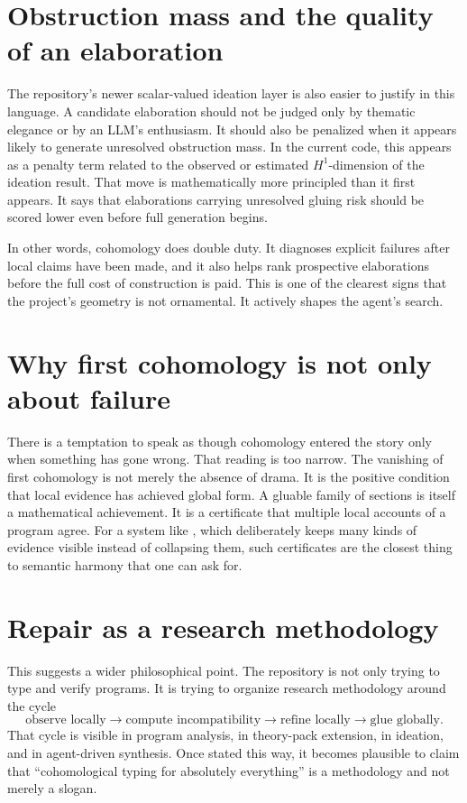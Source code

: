 \section*{Obstruction mass and the quality of an elaboration}
The repository's newer scalar-valued ideation layer is also easier to justify in this
language. A candidate elaboration should not be judged only by thematic elegance or by an
LLM's enthusiasm. It should also be penalized when it appears likely to generate unresolved
obstruction mass. In the current code, this appears as a penalty term related to the
observed or estimated \(H^1\)-dimension of the ideation result. That move is mathematically
more principled than it first appears. It says that elaborations carrying unresolved gluing
risk should be scored lower even before full generation begins.

In other words, cohomology does double duty. It diagnoses explicit failures after local
claims have been made, and it also helps rank prospective elaborations before the full cost
of construction is paid. This is one of the clearest signs that the project's geometry is
not ornamental. It actively shapes the agent's search.

\section*{Why first cohomology is not only about failure}
There is a temptation to speak as though cohomology entered the story only when something has
gone wrong. That reading is too narrow. The vanishing of first cohomology is not merely the
absence of drama. It is the positive condition that local evidence has achieved global form.
A gluable family of sections is itself a mathematical achievement. It is a certificate that
multiple local accounts of a program agree. For a system like \DepPy{}, which deliberately
keeps many kinds of evidence visible instead of collapsing them, such certificates are the
closest thing to semantic harmony that one can ask for.

\section*{Repair as a research methodology}
This suggests a wider philosophical point. The repository is not only trying to type and
verify programs. It is trying to organize research methodology around the cycle
\[
  \text{observe locally} \to \text{compute incompatibility} \to \text{refine locally} \to \text{glue globally}.
\]
That cycle is visible in program analysis, in theory-pack extension, in ideation, and in
agent-driven synthesis. Once stated this way, it becomes plausible to claim that
``cohomological typing for absolutely everything'' is a methodology and not merely a slogan.


